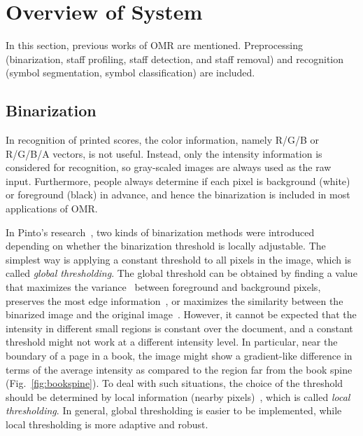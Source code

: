 \chapter{Overview of System}
\label{c:overveiw-of-system}

In this section, previous works of OMR are mentioned. Preprocessing (binarization, staff profiling, staff detection, and staff removal) and recognition (symbol segmentation, symbol classification) are included. 

\section{Binarization}


\graphicspath{{./figsrc/}}
\fi

In recognition of printed scores, the color information, namely R/G/B or R/G/B/A vectors, is not useful. Instead, only the intensity information is considered for recognition, so gray-scaled images are always used as the raw input. Furthermore, people always determine if each pixel is background (white) or foreground (black) in advance, and hence the binarization is included in most applications of OMR.

In Pinto's research~\cite{Pinto:2011:MSB}, two kinds of binarization methods were introduced depending on whether the binarization threshold is locally adjustable. The simplest way is applying a constant threshold to all pixels in the image, which is called \emph{global thresholding}. The global threshold can be obtained by finding a value that maximizes the variance~\cite{Otsu:1979:ATSMfGLH} between foreground and background pixels, preserves the most edge information~\cite{Chen:2008:ADTIBMboED}, or maximizes the similarity between the binarized image and the original image~\cite{Huang:1995:ITbMtMoF,Tsai:1995:AFTSPfMaUH}. However, it cannot be expected that the intensity in different small regions is constant over the document, and a constant threshold might not work at a different intensity level. In particular, near the boundary of a page in a book, the image might show a gradient-like difference in terms of the average intensity as compared to the region far from the book spine (Fig.~\ref{fig:bookspine}). To deal with such situations, the choice of the threshold should be determined by local information (nearby pixels)~\cite{Bernsen:2005:DToGLI}, which is called \emph{local thresholding}. In general, global thresholding is easier to be implemented, while local thresholding is more adaptive and robust.

